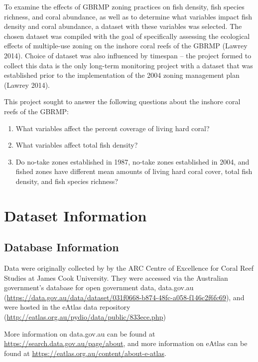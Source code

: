 \documentclass[12pt,]{article}
\providecommand{\tightlist}{%
  \setlength{\itemsep}{0pt}\setlength{\parskip}{0pt}}
\begin{document}
To examine the effects of GBRMP zoning practices on fish density, fish
species richness, and coral abundance, as well as to determine what
variables impact fish density and coral abundance, a dataset with these
variables was selected. The chosen dataset was compiled with the goal of
specifically assessing the ecological effects of multiple-use zoning on
the inshore coral reefs of the GBRMP (Lawrey 2014). Choice of dataset
was also influenced by timespan -- the project formed to collect this
data is the only long-term monitoring project with a dataset that was
established prior to the implementation of the 2004 zoning management
plan (Lawrey 2014).

This project sought to answer the following questions about the inshore
coral reefs of the GBRMP:

\begin{enumerate}
\def\labelenumi{\arabic{enumi}.}
\tightlist
\item
  What variables affect the percent coverage of living hard coral?
\item
  What variables affect total fish density?
\item
  Do no-take zones established in 1987, no-take zones established in
  2004, and fished zones have different mean amounts of living hard
  coral cover, total fish density, and fish species richness?
\end{enumerate}

\newpage

\hypertarget{dataset-information}{%
\section{Dataset Information}\label{dataset-information}}

\hypertarget{database-information}{%
\subsection{Database Information}\label{database-information}}

Data were originally collected by by the ARC Centre of Excellence for
Coral Reef Studies at James Cook University. They were accessed via the
Australian government's database for open government data, data.gov.au
(\url{https://data.gov.au/data/dataset/031f0668-b874-48fc-a058-f146c2f6fc69}),
and were hosted in the eAtlas data repository
(\url{http://eatlas.org.au/pydio/data/public/833ece.php})

More information on data.gov.au can be found at
\url{https://search.data.gov.au/page/about}, and more information on
eAtlas can be found at
\url{https://eatlas.org.au/content/about-e-atlas}.
\end{document}
